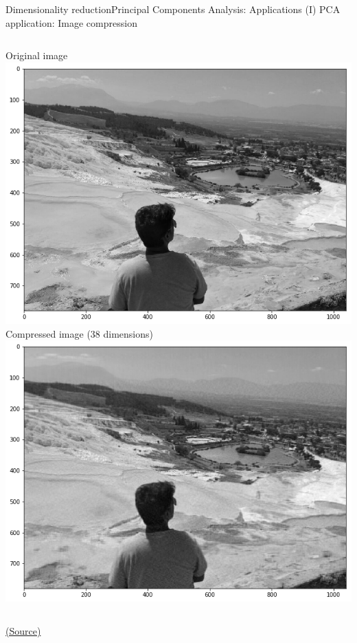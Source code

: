 \documentclass[10pt,compress]{beamer} %
\begin{document}
\begin{frame}{Dimensionality reduction}{Principal Components Analysis: Applications (I)}
	PCA application: Image compression

    \bigskip

    \begin{columns}
            Original image
			\includegraphics[width=\linewidth]{figs/pcaoriginal.png}\\
            Compressed image (38 dimensions)
			\includegraphics[width=\linewidth]{figs/pca150comps.png}
    \end{columns}

   	\centering \tiny{\href{https://www.kaggle.com/code/mirzarahim/introduction-to-pca-image-compression-example}{(Source)}}
\end{frame}
\end{document}
